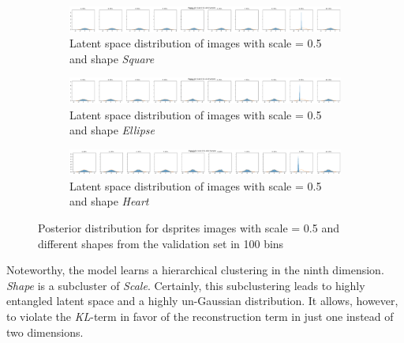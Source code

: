 \begin{figure}
    \centering
    \begin{subfigure}{\textwidth}
        \centering
        \includegraphics[width=\textwidth]{images/latent_space_entanglement/vae_dsprites_lf_10000_dist_shape_1_scale_0_5.png}
        \caption{Latent space distribution of images with scale = 0.5 and shape \textit{Square}}
    \end{subfigure}
    \begin{subfigure}{\textwidth}
        \centering
        \includegraphics[width=\textwidth]{images/latent_space_entanglement/vae_dsprites_lf_10000_dist_shape_2_scale_0_5.png}
        \caption{Latent space distribution of images with scale = 0.5 and shape \textit{Ellipse}}
    \end{subfigure}
    \begin{subfigure}{\textwidth}
        \centering
        \includegraphics[width=\textwidth]{images/latent_space_entanglement/vae_dsprites_lf_10000_dist_shape_3_scale_0_5.png}
        \caption{Latent space distribution of images with scale = 0.5 and shape \textit{Heart}}
    \end{subfigure}
    \caption[VAE Latent Space Distribution - dsprites Scale and Shapes]{Posterior distribution for dsprites images with scale = 0.5 and different shapes from the validation set in 100 bins}
    \label{fig:10000_vae_latent_space_distribution_scales_and_shapes}
\end{figure}

Noteworthy, the model learns a hierarchical clustering in the ninth dimension.
\textit{Shape} is a subcluster of \textit{Scale}.
Certainly, this subclustering leads to highly entangled latent space and a highly un-Gaussian distribution.
It allows, however, to violate the \textit{KL}-term in favor of the reconstruction term in just one instead of two dimensions.

